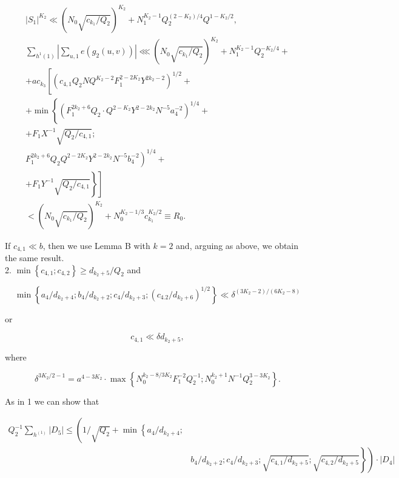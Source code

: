 \documentclass[10pt]{article}
\begin{document}
$$
\begin{gathered}
\left|S_{1}\right|^{K_{2}} \ll\left(N_{0} \sqrt{c_{k_{1}} / Q_{2}}\right)^{K_{2}}+N_{1}^{K_{2}-1} Q_{2}^{\left(2-K_{2}\right) / 4} Q^{1-K_{2} / 2}, \\
\sum_{h^{1}(1)}\left|\sum_{u, 1} e\left(g_{2}(u, v)\right)\right| \lll\left(N_{0} \sqrt{c_{k_{1}} / Q_{2}}\right)^{K_{2}}+N_{1}^{K_{2}-1} Q_{2}^{-K_{2} / 4}+ \\
+a c_{k_{3}}\left[\left(c_{4,1} Q_{2} N Q^{K_{2}-2} F_{1}^{2-2 K_{2}} Y^{2 k_{2}-2}\right)^{1 / 2}+\right. \\
+\min \left\{\left(F_{1}^{2 k_{2}+6} Q_{2} \cdot Q^{2-K_{2}} Y^{2-2 k_{2}} N^{-5} a_{4}^{-2}\right)^{1 / 4}+\right. \\
+F_{1} X^{-1} \sqrt{Q_{2} / c_{4,1}} ; \\
\left.F_{1}^{2 k_{2}+6} Q_{2} Q^{2-2 K_{2}} Y^{2-2 k_{2}} N^{-5} b_{4}^{-2}\right)^{1 / 4}+ \\
\left.\left.+F_{1} Y^{-1} \sqrt{Q_{2} / c_{4,1}}\right\}\right] \\
<\left(N_{0} \sqrt{c_{k_{1}} / Q_{2}}\right)^{K_{2}}+N_{0}^{K_{2}-1 / 3} c_{k_{1}}^{K_{2} / 2} \equiv R_{0} .
\end{gathered}
$$

If $c_{4,1} \ll b$, then we use Lemma B with $k=2$ and, arguing as above, we obtain the same result.\\
2. $\min \left\{c_{4,1} ; c_{4,2}\right\} \geqslant d_{k_{2}+5} / Q_{2}$ and

$$
\min \left\{a_{4} / d_{k_{2}+4} ; b_{4} / d_{k_{2}+2} ; c_{4} / d_{k_{2}+3} ;\left(c_{4.2} / d_{k_{2}+6}\right)^{1 / 2}\right\} \ll \delta^{\left(3 K_{2}-2\right) /\left(6 K_{2}-8\right)}
$$

or

$$
c_{4,1} \ll \delta d_{k_{2}+5},
$$

where

$$
\delta^{3 K_{2} / 2-1}=a^{4-3 K_{2}} \cdot \max \left\{N_{0}^{k_{2}-8 / 3 K_{2}} F_{1}^{-2} Q_{2}^{-1} ; N_{0}^{k_{2}+1} N^{-1} Q_{2}^{3-3 K_{2}}\right\} .
$$

As in 1 we can show that

$$
\begin{aligned}
Q_{2}^{-1} \sum_{h^{(1)}}\left|D_{5}\right| \leqslant\left(1 / \sqrt{Q_{2}}+\min \left\{a_{4} / d_{k_{2}+4} ;\right.\right. & \\
& \left.\left.b_{4} / d_{k_{2}+2} ; c_{4} / d_{k_{2}+3} ; \sqrt{c_{4,1} / d_{k_{2}+5}} ; \sqrt{c_{4,2} / d_{k_{2}+5}}\right\}\right) \cdot\left|D_{4}\right|
\end{aligned}
$$
\end{document}

